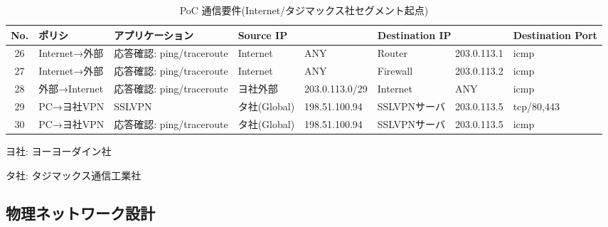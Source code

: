 \begin{landscape}
 \begin{table}[h]
  \centering
  \caption{PoC 通信要件(Internet/タジマックス社セグメント起点)}
  \label{tab:poc-requires-etc}
  \begin{threeparttable}
   \begin{tabularx}{\linewidth}{c|X|X|X|X|X|X|X}
\hline
No. & ポリシ & アプリケーション & \multicolumn{2}{|l|}{Source IP} & \multicolumn{2}{l|}{Destination IP} & Destination Port \\
\hline
\hline
26 & Internet→外部 & 応答確認: ping/traceroute & Internet & ANY & Router & 203.0.113.1 & icmp \\ \hline
27 & Internet→外部 & 応答確認: ping/traceroute & Internet & ANY & Firewall & 203.0.113.2 & icmp \\ \hline
28 & 外部→Internet & 応答確認: ping/traceroute & ヨ社外部 & 203.0.113.0/29 & Internet & ANY & icmp \\ \hline
29 & PC→ヨ社VPN & SSLVPN & タ社(Global) & 198.51.100.94 & SSLVPNサーバ & 203.0.113.5 & tcp/80,443 \\ \hline
30 & PC→ヨ社VPN & 応答確認: ping/traceroute & タ社(Global) & 198.51.100.94 & SSLVPNサーバ & 203.0.113.5 & icmp \\ \hline
   \end{tabularx}
   \begin{tablenotes}
    \footnotesize
    \item ヨ社: ヨーヨーダイン社
    \item タ社: タジマックス通信工業社
   \end{tablenotes}
  \end{threeparttable}
 \end{table}
\end{landscape}

  \subsection{物理ネットワーク設計}

